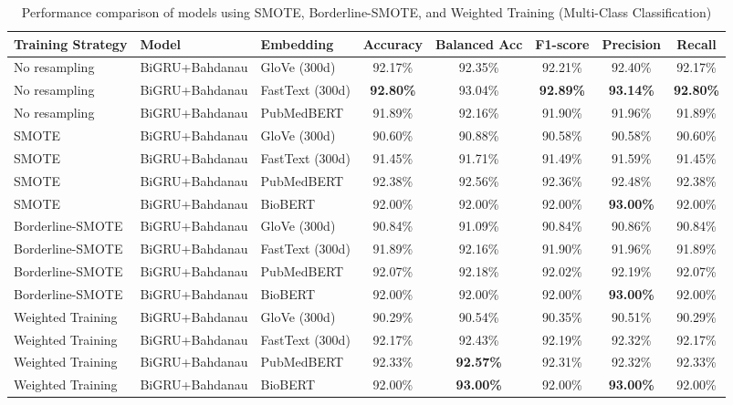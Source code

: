 \documentclass[12pt]{report}
\begin{document}
\begin{table}[H]
    \centering
    \scriptsize
    \caption{Performance comparison of models using SMOTE, Borderline-SMOTE, and Weighted Training (Multi-Class Classification)}
    \label{tab:performance_multiclass}
    \begin{tabular}{|l|l|l|c|c|c|c|c|}
    \hline
    \textbf{Training Strategy} & \textbf{Model} & \textbf{Embedding} & \textbf{Accuracy} & \textbf{Balanced Acc} & \textbf{F1-score} & \textbf{Precision} & \textbf{Recall} \\
    \hline
    No resampling & BiGRU+Bahdanau & GloVe (300d)     & 92.17\% & 92.35\% & 92.21\% & 92.40\% & 92.17\% \\
    No resampling & BiGRU+Bahdanau & FastText (300d)  & \textbf{92.80\%} & 93.04\% & \textbf{92.89\%} & \textbf{93.14\%} & \textbf{92.80\%} \\
    No resampling & BiGRU+Bahdanau & PubMedBERT       & 91.89\% & 92.16\% & 91.90\% & 91.96\% & 91.89\% \\
    \hline
    SMOTE         & BiGRU+Bahdanau & GloVe (300d)     & 90.60\% & 90.88\% & 90.58\% & 90.58\% & 90.60\% \\
    SMOTE         & BiGRU+Bahdanau & FastText (300d)  & 91.45\% & 91.71\% & 91.49\% & 91.59\% & 91.45\% \\
    SMOTE         & BiGRU+Bahdanau & PubMedBERT       & 92.38\% & 92.56\% & 92.36\% & 92.48\% & 92.38\% \\
    SMOTE         & BiGRU+Bahdanau & BioBERT          & 92.00\% & 92.00\% & 92.00\% & \textbf{93.00\%} & 92.00\% \\
    \hline
    Borderline-SMOTE & BiGRU+Bahdanau & GloVe (300d)   & 90.84\% & 91.09\% & 90.84\% & 90.86\% & 90.84\% \\
    Borderline-SMOTE & BiGRU+Bahdanau & FastText (300d)& 91.89\% & 92.16\% & 91.90\% & 91.96\% & 91.89\% \\
    Borderline-SMOTE & BiGRU+Bahdanau & PubMedBERT    & 92.07\% & 92.18\% & 92.02\% & 92.19\% & 92.07\% \\
    Borderline-SMOTE & BiGRU+Bahdanau & BioBERT       & 92.00\% & 92.00\% & 92.00\% & \textbf{93.00\%} & 92.00\% \\
    \hline
    Weighted Training & BiGRU+Bahdanau & GloVe (300d)  & 90.29\% & 90.54\% & 90.35\% & 90.51\% & 90.29\% \\
    Weighted Training & BiGRU+Bahdanau & FastText (300d)& 92.17\% & 92.43\% & 92.19\% & 92.32\% & 92.17\% \\
    Weighted Training & BiGRU+Bahdanau & PubMedBERT    & 92.33\% & \textbf{92.57\%} & 92.31\% & 92.32\% & 92.33\% \\
    Weighted Training & BiGRU+Bahdanau & BioBERT       & 92.00\% & \textbf{93.00\%} & 92.00\% & \textbf{93.00\%} & 92.00\% \\
    \hline
    \end{tabular}
\end{table}
\end{document}
